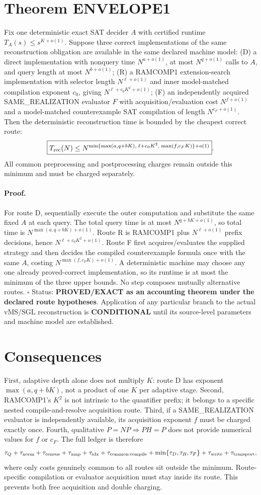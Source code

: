 \documentclass[11pt]{article}
\begin{document}
\section*{Theorem ENVELOPE1}
Fix one deterministic exact SAT decider $A$ with certified runtime $T_A(s)\le s^{K+o(1)}$. Suppose three correct implementations of the same reconstruction obligation are available in the same declared machine model:
(D) a direct implementation with nonquery time $N^{a+o(1)}$, at most $N^{q+o(1)}$ calls to $A$, and query length at most $N^{b+o(1)}$;
(R) a RAMCOMP1 extension-search implementation with selector length $N^{\ell+o(1)}$ and inner model-matched compilation exponent $c_0$, giving $N^{\ell+c_0K^2+o(1)}$;
(F) an independently acquired SAME\_REALIZATION evaluator $F$ with acquisition/evaluation cost $N^{f+o(1)}$ and a model-matched counterexample SAT compilation of length $N^{c_F+o(1)}$.
Then the deterministic reconstruction time is bounded by the cheapest correct route:
\[
\boxed{T_{\rm rec}(N)\le N^{\min\{\max(a,q+bK),\;\ell+c_0K^2,\;\max(f,c_FK)\}+o(1)}}.
\]
All common preprocessing and postprocessing charges remain outside this minimum and must be charged separately.
\paragraph{Proof.}
For route D, sequentially execute the outer computation and substitute the same fixed $A$ at each query. The total query time is at most $N^{q+bK+o(1)}$, so total time is $N^{\max(a,q+bK)+o(1)}$. Route R is RAMCOMP1 plus $N^{\ell+o(1)}$ prefix decisions, hence $N^{\ell+c_0K^2+o(1)}$. Route F first acquires/evaluates the supplied strategy and then decides the compiled counterexample formula once with the same $A$, costing $N^{\max(f,c_FK)+o(1)}$. A deterministic machine may choose any one already proved-correct implementation, so its runtime is at most the minimum of the three upper bounds. No step composes mutually alternative routes. \(\square\)
Status: \textbf{PROVED/EXACT as an accounting theorem under the declared route hypotheses}. Application of any particular branch to the actual vMS/SGL reconstruction is \textbf{CONDITIONAL} until its source-level parameters and machine model are established.
\section*{Consequences}
First, adaptive depth alone does not multiply $K$: route D has exponent $\max(a,q+bK)$, not a product of one $K$ per adaptive stage. Second, RAMCOMP1's $K^2$ is not intrinsic to the quantifier prefix; it belongs to a specific nested compile-and-resolve acquisition route. Third, if a SAME\_REALIZATION evaluator is independently available, its acquisition exponent $f$ must be charged exactly once. Fourth, qualitative $P=NP\Rightarrow PH=P$ does not provide numerical values for $f$ or $c_F$.
The full ledger is therefore
\[
\tau_Q+\tau_{\rm norm}+\tau_{\rm census}+\tau_{\rm amp}+\tau_{\rm idx}+\tau_{\rm common\,compile}+\min\{\tau_D,\tau_R,\tau_F\}+\tau_{\rm write}+\tau_{\rm transport},
\]
where only costs genuinely common to all routes sit outside the minimum. Route-specific compilation or evaluator acquisition must stay inside its route. This prevents both free acquisition and double charging.
\end{document}
